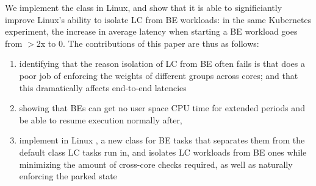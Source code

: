 We implement the \beclass{} class in Linux, and show that it is able to
significiantly improve Linux's ability to isolate LC from BE workloads: in the
same Kubernetes experiment, the increase in average latency when starting a BE
workload goes from $>$2x to 0. The contributions of this paper are thus as
follows: 
\begin{enumerate}
    \item identifying that the reason isolation of LC from BE often fails is that
    \cgroups{} does a poor job of enforcing the weights of different groups
    across cores; and that this dramatically affects end-to-end latencies
    \item showing that BEs can get no user space CPU time for extended periods
    and be able to resume execution normally after,
    \item implement in Linux \beclass{}, a new class for BE tasks that separates
    them from the default class LC tasks run in, and isolates LC workloads from
    BE ones while minimizing the amount of cross-core checks required, as well as
    naturally enforcing the parked state
\end{enumerate}

